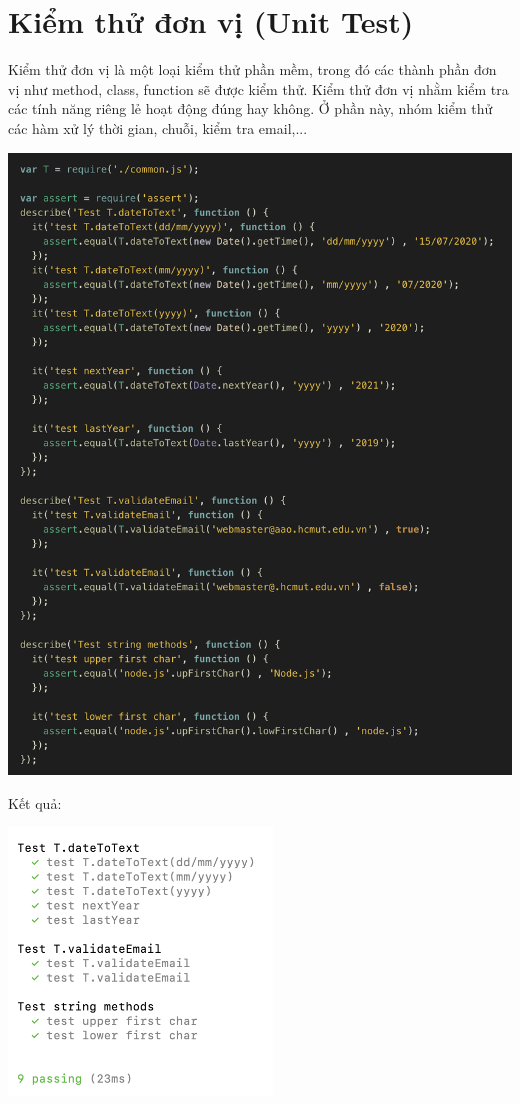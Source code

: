 \section{Kiểm thử đơn vị (Unit Test)}
Kiểm thử đơn vị là một loại kiểm thử phần mềm, trong đó các thành phần đơn vị như method, class, function sẽ được kiểm thử. Kiểm thử đơn vị nhằm kiểm tra các tính năng riêng lẻ hoạt động đúng hay không. Ở phần này, nhóm kiểm thử các hàm xử lý thời gian, chuỗi, kiểm tra email,...
\begin{center}
  \captionsetup{type=figure}
  \includegraphics[width=15cm]{img/unitTestCode.png}
\end{center}
\newpage
Kết quả: 

\begin{center}
  \captionsetup{type=figure}
  \includegraphics[width=7cm]{img/unitTestSolution.png}
\end{center}
